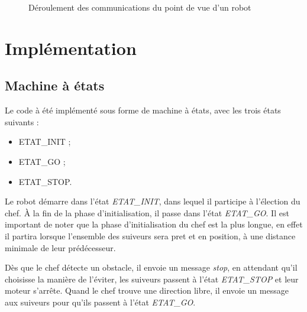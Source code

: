 \documentclass[a4paper,12pt]{article}
\begin{document}
\begin{figure}[!h]
        \caption{Déroulement des communications du point de vue d'un robot}
        \label{fig:Comm}
\end{figure}

\section{Implémentation}
\subsection{Machine à états}
Le code à été implémenté sous forme de machine à états, avec les trois états suivants :
\begin{itemize}
        \item ETAT\_INIT ;
        \item ETAT\_GO ;
        \item ETAT\_STOP.
\end{itemize}

Le robot démarre dans l'état \textit{ETAT\_INIT}, dans lequel il participe à l'élection du chef. À la fin de la phase d'initialisation, il passe dans l'état \textit{ETAT\_GO}.
Il est important de noter que la phase d'initialisation du chef est la plus longue, en effet il partira lorsque l'ensemble des suiveurs sera pret et en position, à une distance minimale de leur prédécesseur.

Dès que le chef détecte un obstacle, il envoie un message \textit{stop}, en attendant qu'il choisisse la manière de l'éviter, les suiveurs passent à l'état \textit{ETAT\_STOP} et leur moteur s'arrête.
Quand le chef trouve une direction libre, il envoie un message aux suiveurs pour qu'ils passent à l'état \textit{ETAT\_GO}.
\end{document}
